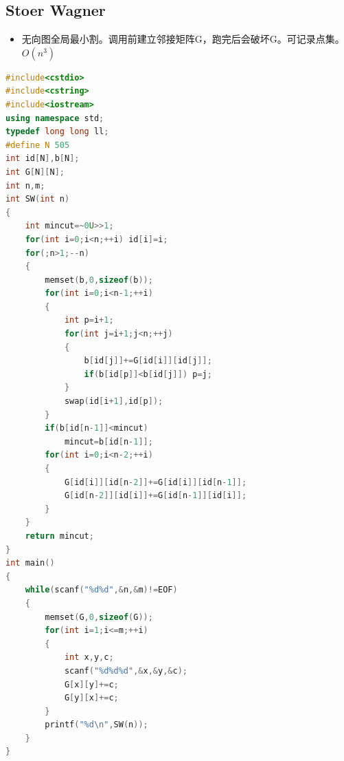 \documentclass[UTF8,a4paper,titlepage]{ctexart}
\begin{document}
 	\subsection{Stoer Wagner}
\begin{itemize}
\item 无向图全局最小割。调用前建立邻接矩阵G，跑完后会破坏G。可记录点集。$O(n^3)$
\end{itemize}

 	\begin{lstlisting}[language=C++]
#include<cstdio>
#include<cstring>
#include<iostream>
using namespace std;
typedef long long ll;
#define N 505
int id[N],b[N];
int G[N][N];
int n,m;
int SW(int n)
{
    int mincut=~0U>>1;
    for(int i=0;i<n;++i) id[i]=i;
    for(;n>1;--n)
    {
        memset(b,0,sizeof(b));
        for(int i=0;i<n-1;++i)
        {
            int p=i+1;
            for(int j=i+1;j<n;++j)
            {
                b[id[j]]+=G[id[i]][id[j]];
                if(b[id[p]]<b[id[j]]) p=j;
            }
            swap(id[i+1],id[p]);
        }
        if(b[id[n-1]]<mincut)
            mincut=b[id[n-1]];
        for(int i=0;i<n-2;++i)
        {
            G[id[i]][id[n-2]]+=G[id[i]][id[n-1]];
            G[id[n-2]][id[i]]+=G[id[n-1]][id[i]];
        }
    }
    return mincut;
}
int main()
{
    while(scanf("%d%d",&n,&m)!=EOF)
    {
        memset(G,0,sizeof(G));
        for(int i=1;i<=m;++i)
        {
            int x,y,c;
            scanf("%d%d%d",&x,&y,&c);
            G[x][y]+=c;
            G[y][x]+=c;
        }
        printf("%d\n",SW(n));
    }
}

 	\end{lstlisting}
\end{document}
